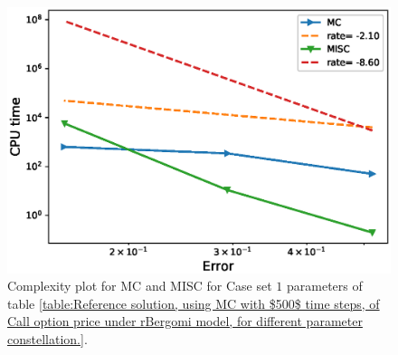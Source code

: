\documentclass[11pt]{article}
\begin{document}
	\begin{figure}[h!]
	\centering
	\includegraphics[width=0.7\linewidth]{./figures/rBergomi_Complexity_rates/set1/error_vs_time_set1}
	
	\caption{Complexity plot for   MC and MISC for Case set $1$ parameters of table \ref{table:Reference solution, using MC with $500$ time steps, of Call option price under rBergomi model, for different parameter constellation.}.}
	\label{fig:Complexity plot for MC and MISC for Case set $1$ parameters}
\end{figure}


\end{document}
